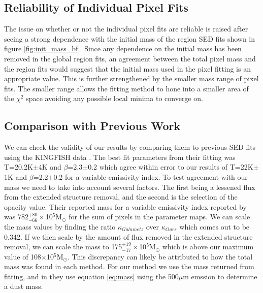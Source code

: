 \subsection{Reliability of Individual Pixel Fits}

The issue on whether or not the individual pixel fits are reliable is raised after seeing a strong dependence with the initial mass of the region SED fits shown in figure \ref{fig:init_mass_bf}.  Since any dependence on the initial mass has been removed in the global region fits, an agreement between the total pixel mass and the region fits would suggest that the initial mass used in the pixel fitting is an appropriate value.  This is further strengthened by the smaller mass range of pixel fits.  The smaller range allows the fitting method to hone into a smaller area of the $\chi^2$ space avoiding any possible local minima to converge on.

\subsection{Comparison with Previous Work}

We can check the validity of our results by comparing them to previous SED fits using the KINGFISH data \citep{galametz2012}.  The best fit parameters from their fitting was T=20.2K$\pm$4K and $\beta$=2.3$\pm$0.2 which agree within error to our results of T=22K$\pm$1K and $\beta$=2.2$\pm$0.2 for a variable emissivity index.  To test agreement with our mass we need to take into account several factors.  The first being a lessened flux from the extended structure removal, and the second is the selection of the opacity value.  Their reported mass for a variable emissivity index reported by \cite{galametz2012} was 782$^{+80}_{-66}\times$10$^5$M$_\odot$ for the sum of pixels in the parameter maps.  We can scale the mass values by finding the ratio $\kappa_{Galametz}$ over $\kappa_{Ours}$ which comes out to be 0.342.  If we then scale by the amount of flux removed in the extended structure removal, we can scale the mass to 175$^{+19}_{-17}\times$10$^5$M$_\odot$ which is above our maximum value of 108$\times$10$^5$M$_\odot$.  This discrepancy can likely be attributed to how the total mass was found in each method.  For our method we use the mass returned from fitting, and in \cite{galametz2012} they use equation \ref{eq:mass} using the 500$\mu$m emssion to determine a dust mass.

